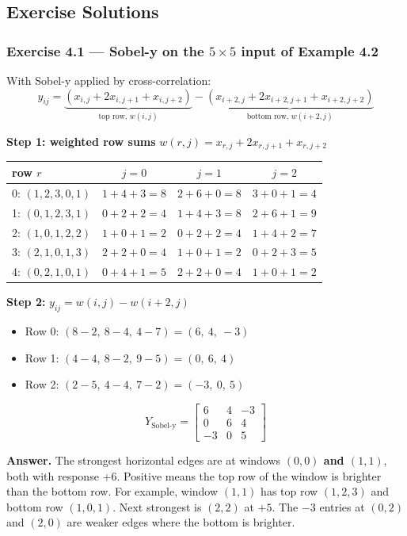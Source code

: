 \subsection*{Exercise Solutions}

\subsubsection*{Exercise 4.1 --- Sobel-y on the $5\times5$ input of Example 4.2}

With Sobel-y applied by cross-correlation:
\[
y_{ij} = \underbrace{(x_{i,j} + 2x_{i,j+1} + x_{i,j+2})}_{\text{top row, } w(i,j)} - \underbrace{(x_{i+2,j} + 2x_{i+2,j+1} + x_{i+2,j+2})}_{\text{bottom row, } w(i+2,j)}
\]

\textbf{Step 1: weighted row sums} $w(r,j) = x_{r,j} + 2x_{r,j+1} + x_{r,j+2}$

\begin{center}
\begin{tabular}{lccc}
\toprule
row $r$ & $j=0$ & $j=1$ & $j=2$ \\
\midrule
0: $(1,2,3,0,1)$ & $1+4+3=8$ & $2+6+0=8$ & $3+0+1=4$ \\
1: $(0,1,2,3,1)$ & $0+2+2=4$ & $1+4+3=8$ & $2+6+1=9$ \\
2: $(1,0,1,2,2)$ & $1+0+1=2$ & $0+2+2=4$ & $1+4+2=7$ \\
3: $(2,1,0,1,3)$ & $2+2+0=4$ & $1+0+1=2$ & $0+2+3=5$ \\
4: $(0,2,1,0,1)$ & $0+4+1=5$ & $2+2+0=4$ & $1+0+1=2$ \\
\bottomrule
\end{tabular}
\end{center}

\textbf{Step 2:} $y_{ij} = w(i,j) - w(i+2,j)$
\begin{itemize}[nosep]
  \item Row 0: $(8-2,\ 8-4,\ 4-7) = (6,\ 4,\ -3)$
  \item Row 1: $(4-4,\ 8-2,\ 9-5) = (0,\ 6,\ 4)$
  \item Row 2: $(2-5,\ 4-4,\ 7-2) = (-3,\ 0,\ 5)$
\end{itemize}
\[
Y_{\text{Sobel-y}} = \begin{bmatrix}6&4&-3\\0&6&4\\-3&0&5\end{bmatrix}
\]

\textbf{Answer.} The strongest horizontal edges are at windows \textbf{$(0,0)$ and $(1,1)$}, both with response $+6$. Positive means the top row of the window is brighter than the bottom row. For example, window $(1,1)$ has top row $(1,2,3)$ and bottom row $(1,0,1)$. Next strongest is $(2,2)$ at $+5$. The $-3$ entries at $(0,2)$ and $(2,0)$ are weaker edges where the bottom is brighter.

